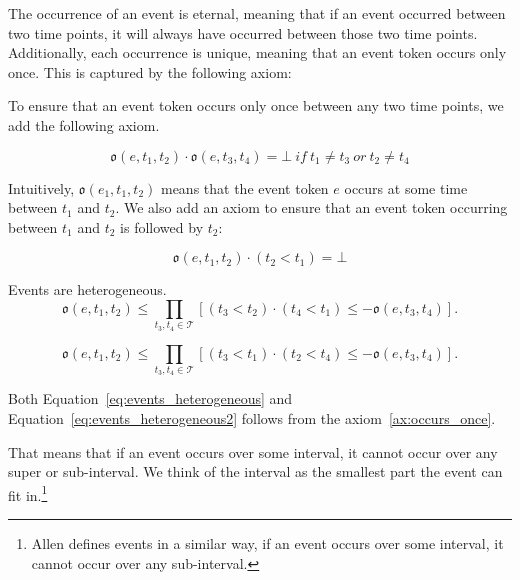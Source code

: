 The occurrence of an event is eternal, meaning that if an event occurred between two time points, it will always have occurred between those two time points. Additionally, each occurrence is unique, meaning that an event token occurs only once. This is captured by the following axiom:

To ensure that an event token occurs only once between any two time points, we add the following axiom.

\begin{axiom}
    \begin{equation}
        \mathfrak{o}(e, t_1, t_2) \cdot \mathfrak{o}(e, t_3, t_4) = \bot  \ if \ t_1 \neq t_3 \ or \  t_2 \neq t_4
    \end{equation}
    \label{ax:occurs_once}
\end{axiom}

Intuitively, $\mathfrak{o}(e_1, t_1, t_2)$ means that the event token $e$ occurs at some time between $t_1$ and $t_2$. We also add an axiom to ensure that an event token occurring between $t_1$ and $t_2$ is followed by $t_2$:

\begin{axiom}
    \begin{equation}
        \mathfrak{o}(e, t_1, t_2) \cdot (t_2 < t_1) = \bot
    \end{equation}
\end{axiom}

\begin{theorem} Events are heterogeneous.
    \begin{equation}
        \mathfrak{o}(e, t_1, t_2) \leq \prod_{t_3, t_4 \in \mathcal{T}} [(t_3 < t_2) \cdot (t_4 < t_1)
            \leq - \mathfrak{o}(e, t_3, t_4)].
        \label{eq:events_heterogeneous}
    \end{equation}
\end{theorem}
\begin{theorem}
    \begin{equation}
        \mathfrak{o}(e, t_1, t_2) \leq \prod_{t_3, t_4 \in \mathcal{T}} [(t_3 < t_1) \cdot (t_2 < t_4)
            \leq - \mathfrak{o}(e, t_3, t_4)].
        \label{eq:events_heterogeneous2}
    \end{equation}
\end{theorem}

Both Equation~\ref{eq:events_heterogeneous} and Equation~\ref{eq:events_heterogeneous2} follows from the
axiom~\ref{ax:occurs_once}.

That means that if an event occurs over some interval, it cannot occur over any super or sub-interval.
We think of the interval as the smallest part the event can fit in.\footnote{Allen \cite{allen1984towards} defines events in a similar way, if an event occurs over some interval, it cannot occur over any sub-interval.
}

